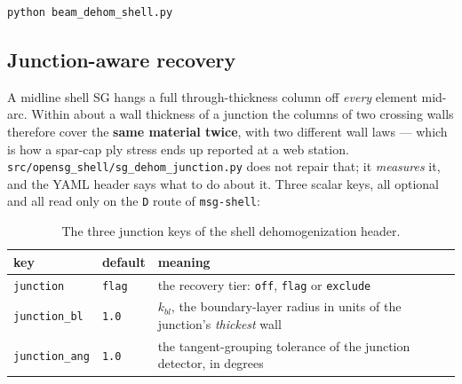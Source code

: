\begin{lstlisting}[style=shellst]
python beam_dehom_shell.py
\end{lstlisting}

\subsection{Junction-aware recovery}
\label{sec:shell-dehom-junction}

A midline shell SG hangs a full through-thickness column off \emph{every}
element mid-arc. Within about a wall thickness of a junction the columns of two
crossing walls therefore cover the \textbf{same material twice}, with two
different wall laws --- which is how a spar-cap ply stress ends up reported at a
web station. \texttt{src/opensg\_shell/sg\_dehom\_junction.py} does not repair
that; it \emph{measures} it, and the YAML header says what to do about it.
Three scalar keys, all optional and all read only on the \texttt{D} route of
\texttt{msg-shell}:

\begin{table}[htbp]
\centering
\small
\begin{tabular}{llp{7.8cm}}
\toprule
key & default & meaning \\
\midrule
\texttt{junction} & \texttt{flag} & the recovery tier: \texttt{off},
  \texttt{flag} or \texttt{exclude} \\
\texttt{junction\_bl} & \texttt{1.0} & $k_{bl}$, the boundary-layer radius in
  units of the junction's \emph{thickest} wall \\
\texttt{junction\_ang} & \texttt{1.0} & the tangent-grouping tolerance of the
  junction detector, in degrees \\
\bottomrule
\end{tabular}
\caption{The three junction keys of the shell dehomogenization header.}
\label{tab:shell-junction-keys}
\end{table}


